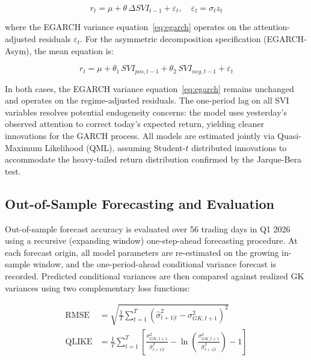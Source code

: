 \documentclass[12pt, a4paper]{article}
\begin{document}
\begin{equation}
  r_t = \mu + \theta\, \Delta SVI_{t-1} + \varepsilon_t, \quad \varepsilon_t = \sigma_t z_t
  \label{eq:mean_svi}
\end{equation}

where the EGARCH variance equation~\eqref{eq:egarch} operates on the attention-adjusted residuals $\varepsilon_t$. For the asymmetric decomposition specification (EGARCH-Asym), the mean equation is:

\begin{equation}
  r_t = \mu + \theta_1\, SVI_{pos,t-1} + \theta_2\, SVI_{neg,t-1} + \varepsilon_t
  \label{eq:mean_asym}
\end{equation}

In both cases, the EGARCH variance equation~\eqref{eq:egarch} remains unchanged and operates on the regime-adjusted residuals. The one-period lag on all SVI variables resolves potential endogeneity concerns: the model uses yesterday's observed attention to correct today's expected return, yielding cleaner innovations for the GARCH process. All models are estimated jointly via Quasi-Maximum Likelihood (QML), assuming Student-$t$ distributed innovations to accommodate the heavy-tailed return distribution confirmed by the Jarque-Bera test.

\subsection{Out-of-Sample Forecasting and Evaluation}

Out-of-sample forecast accuracy is evaluated over 56 trading days in Q1 2026 using a recursive (expanding window) one-step-ahead forecasting procedure. At each forecast origin, all model parameters are re-estimated on the growing in-sample window, and the one-period-ahead conditional variance forecast is recorded. Predicted conditional variances are then compared against realized GK variances using two complementary loss functions:

\begin{align}
  \text{RMSE} &= \sqrt{\frac{1}{T}\sum_{t=1}^{T}\!\left(\hat{\sigma}^{2}_{t+1|t} - \sigma^{2}_{GK,t+1}\right)^{2}} \label{eq:rmse}\\[4pt]
  \text{QLIKE} &= \frac{1}{T}\sum_{t=1}^{T}\left[
    \frac{\sigma^{2}_{GK,t+1}}{\hat{\sigma}^{2}_{t+1|t}}
    - \ln\!\left(\frac{\sigma^{2}_{GK,t+1}}{\hat{\sigma}^{2}_{t+1|t}}\right) - 1
  \right] \label{eq:qlike}
\end{align}
\end{document}
